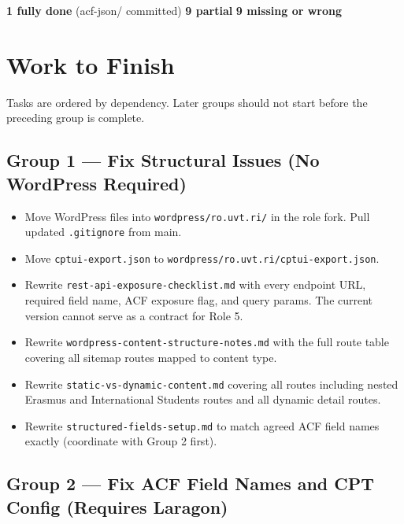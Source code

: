 \documentclass[12pt,a4paper]{article}
\begin{document}
\vspace{0.5em}
\begin{darkbox}
\textbf{1 fully done} (acf-json/ committed) \quad\textbf{9 partial} \quad\textbf{9 missing or wrong}
\end{darkbox}

\section{Work to Finish}

Tasks are ordered by dependency. Later groups should not start before the preceding group
is complete.

\subsection{Group 1 --- Fix Structural Issues (No WordPress Required)}

\begin{itemize}
    \item[$\square$] Move WordPress files into \texttt{wordpress/ro.uvt.ri/} in the role fork. Pull updated \texttt{.gitignore} from main.
    \item[$\square$] Move \texttt{cptui-export.json} to \texttt{wordpress/ro.uvt.ri/cptui-export.json}.
    \item[$\square$] Rewrite \texttt{rest-api-exposure-checklist.md} with every endpoint URL, required field name, ACF exposure flag, and query params. The current version cannot serve as a contract for Role 5.
    \item[$\square$] Rewrite \texttt{wordpress-content-structure-notes.md} with the full route table covering all sitemap routes mapped to content type.
    \item[$\square$] Rewrite \texttt{static-vs-dynamic-content.md} covering all routes including nested Erasmus and International Students routes and all dynamic detail routes.
    \item[$\square$] Rewrite \texttt{structured-fields-setup.md} to match agreed ACF field names exactly (coordinate with Group 2 first).
\end{itemize}

\subsection{Group 2 --- Fix ACF Field Names and CPT Config (Requires Laragon)}
\end{document}

